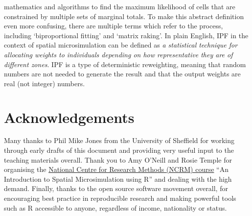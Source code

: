 \documentclass[a4paper, 11pt, twoside]{article}
\begin{document}
\begin{itemize}
mathematics and algorithms to find the maximum likelihood of cells that are constrained by
multiple sets of marginal totals. To make this abstract definition even more confusing, there are
multiple terms which refer to the process, including `biproportional fitting' and `matrix raking'.
In plain English, IPF in the context of spatial microsimulation
can be defined as \emph{a statistical technique for allocating weights to individuals depending
on how representative they are of different zones}. IPF is a type of deterministic reweighting,
meaning that random numbers are not needed to generate the result and that the output weights are real (not
integer) numbers.
\end{itemize}

\section{Acknowledgements}
Many thanks to Phil Mike Jones from the University of Sheffield for working through early drafts
of this document and providing very useful input to the teaching materials overall.
Thank you to Amy O'Neill and Rosie Temple for organising the
\href{http://www.ncrm.ac.uk/training/show.php?article=4786}{National Centre for Research Methods (NCRM) course}
``An Introduction to Spatial Microsimulation using R''
and dealing with the high demand. Finally, thanks to the open source software movement
overall, for encouraging best practice in reproducible research and
making powerful tools such as R accessible to anyone, regardless of income, nationality
or status.

  \label{Bibliography}


\end{document}

